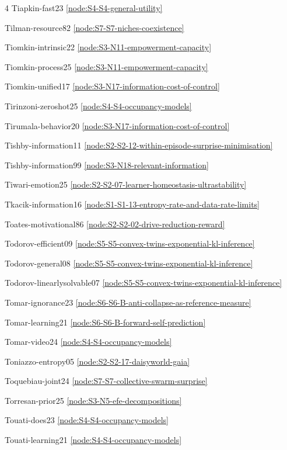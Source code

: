 \documentclass[10pt]{article}
\begin{document}
{\begin{multicols}{4}
Tiapkin-fast23 \hfill \ref{node:S4-S4-general-utility}\par
Tilman-resource82 \hfill \ref{node:S7-S7-niches-coexistence}\par
Tiomkin-intrinsic22 \hfill \ref{node:S3-N11-empowerment-capacity}\par
Tiomkin-process25 \hfill \ref{node:S3-N11-empowerment-capacity}\par
Tiomkin-unified17 \hfill \ref{node:S3-N17-information-cost-of-control}\par
Tirinzoni-zeroshot25 \hfill \ref{node:S4-S4-occupancy-models}\par
Tirumala-behavior20 \hfill \ref{node:S3-N17-information-cost-of-control}\par
Tishby-information11 \hfill \ref{node:S2-S2-12-within-episode-surprise-minimisation}\par
Tishby-information99 \hfill \ref{node:S3-N18-relevant-information}\par
Tiwari-emotion25 \hfill \ref{node:S2-S2-07-learner-homeostasis-ultrastability}\par
Tkacik-information16 \hfill \ref{node:S1-S1-13-entropy-rate-and-data-rate-limits}\par
Toates-motivational86 \hfill \ref{node:S2-S2-02-drive-reduction-reward}\par
Todorov-efficient09 \hfill \ref{node:S5-S5-convex-twins-exponential-kl-inference}\par
Todorov-general08 \hfill \ref{node:S5-S5-convex-twins-exponential-kl-inference}\par
Todorov-linearlysolvable07 \hfill \ref{node:S5-S5-convex-twins-exponential-kl-inference}\par
Tomar-ignorance23 \hfill \ref{node:S6-S6-B-anti-collapse-as-reference-measure}\par
Tomar-learning21 \hfill \ref{node:S6-S6-B-forward-self-prediction}\par
Tomar-video24 \hfill \ref{node:S4-S4-occupancy-models}\par
Toniazzo-entropy05 \hfill \ref{node:S2-S2-17-daisyworld-gaia}\par
Toquebiau-joint24 \hfill \ref{node:S7-S7-collective-swarm-surprise}\par
Torresan-prior25 \hfill \ref{node:S3-N5-efe-decompositions}\par
Touati-does23 \hfill \ref{node:S4-S4-occupancy-models}\par
Touati-learning21 \hfill \ref{node:S4-S4-occupancy-models}\par

\end{multicols}}
\end{document}
